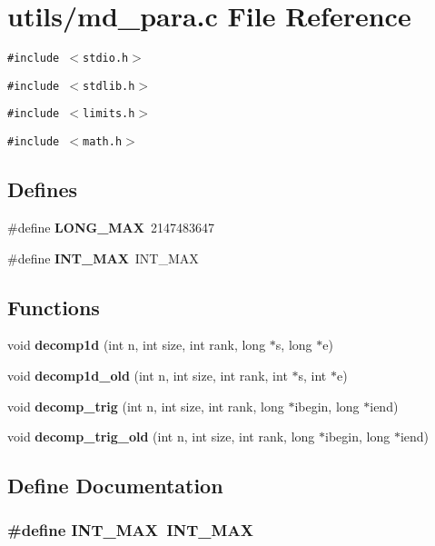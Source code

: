 \section{utils/md\_\-para.c File Reference}
\label{md__para_8c}
{\tt \#include $<$stdio.h$>$}\par
{\tt \#include $<$stdlib.h$>$}\par
{\tt \#include $<$limits.h$>$}\par
{\tt \#include $<$math.h$>$}\par
\subsection*{Defines}
\begin{CompactItemize}
\item 
\#define {\bf LONG\_\-MAX}~2147483647
\item 
\#define {\bf INT\_\-MAX}~INT\_\-MAX
\end{CompactItemize}
\subsection*{Functions}
\begin{CompactItemize}
\item 
void {\bf decomp1d} (int n, int size, int rank, long $\ast$s, long $\ast$e)
\item 
void {\bf decomp1d\_\-old} (int n, int size, int rank, int $\ast$s, int $\ast$e)
\item 
void {\bf decomp\_\-trig} (int n, int size, int rank, long $\ast$ibegin, long $\ast$iend)
\item 
void {\bf decomp\_\-trig\_\-old} (int n, int size, int rank, long $\ast$ibegin, long $\ast$iend)
\end{CompactItemize}


\subsection{Define Documentation}
\subsubsection{\setlength{\rightskip}{0pt plus 5cm}\#define INT\_\-MAX~INT\_\-MAX}\label{md__para_8c_9ec306f36d50c7375e74f0d1c55a3a67}


